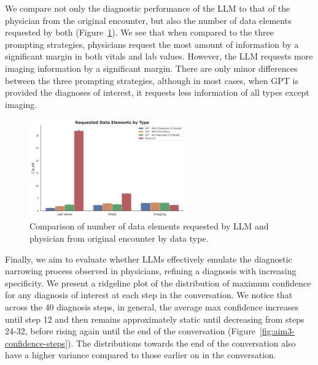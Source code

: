 We compare not only the diagnostic performance of the LLM to that of the physician from the original encounter, but also the number of data elements requested by both (Figure~\ref{fig:aim3-data-types}). We see that when compared to the three prompting strategies, physicians request the most amount of information by a significant margin in both vitals and lab values. However, the LLM requests more imaging information by a significant margin. There are only minor differences between the three prompting strategies, although in most cases, when GPT is provided the diagnoses of interest, it requests less information of all types except imaging. 

\begin{figure}
    \centering
	\includegraphics[width=0.6\textwidth] {figures/aim3/requested_data_by_type.png}
	\caption{Comparison of number of data elements requested by LLM and physician from original encounter by data type.} \label{fig:aim3-data-types}
\end{figure}    

Finally, we aim to evaluate whether LLMs effectively emulate the diagnostic narrowing process observed in physicians, refining a diagnosis with increasing specificity. We present a ridgeline plot of the distribution of maximum confidence for any diagnosis of interest at each step in the conversation. We notice that across the 40 diagnosis steps, in general, the average max confidence increases until step 12 and then remains approximately static until decreasing from steps 24-32, before rising again until the end of the conversation (Figure~\ref{fig:aim3-confidence-steps}). The distributions towards the end of the conversation also have a higher variance compared to those earlier on in the conversation. 

